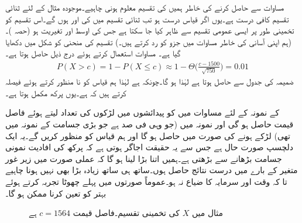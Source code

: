  مساوات  سے  حاصل کرنے کی خاطر ہمیں  کی تقسیم  معلوم ہونی چاہیے۔موجودہ مثال کے لئے ثنائی تقسیم کافی درست ہے۔یوں اگر قیاس درست ہو تب ثنائی تقسیم میں  کی  اور  ہوں گے۔اس تقسیم کو تخمینی طور پر ایسی عمومی تقسیم سے  ظاہر کیا جا سکتا ہے جس کی اوسط  اور تغیریت  ہو (حصہ )۔ (ہم اپنی آسانی کی خاطر مساوات  میں جزو  کو رد کرتے ہیں۔) تقسیم کی منحنی کو شکل  میں دکھایا گیا ہے۔ مساوات  استعمال کرتے ہوئے درج ذیل حاصل ہوتا ہے۔
\begin{align*}
P(X>c)=1-P(X\le c)\approx 1-\Theta\big(\frac{c-1500}{\sqrt{750}}\big)=0.01
\end{align*}
ضمیمہ  کی جدول  سے  حاصل ہوتا ہے  لہٰذا  ہو گا۔چونکہ  ہے لہٰذا ہم قیاس کو نا منظور کرتے ہوئے فیصلہ کرتے ہیں کہ  ہے۔یوں پرکھ مکمل ہوتا ہے۔

 کے نمونہ کے لئے  مساوات  میں  کو  پیدائشوں میں لڑکوں کی تعداد لیتے ہوئے  فاصل قیمت  حاصل ہو گی اور نمونہ میں  (جو وہی فی صد ہے جو  بڑی جسامت کے نمونہ میں تھی)  لڑکے ہونے کی صورت میں  حاصل ہو گا اور ہم قیاس کو منظور کریں گے۔یہ ایک دلچسپ صورت حال ہے جس سے یہ حقیقت اجاگر ہوتی ہے کہ پرکھ کی افادیت نمونی جسامت  بڑھانے سے بڑھتی ہے۔ہمیں  اتنا بڑا لینا ہو گا کہ عملی صورت میں زیر غور متغیر کے بارے میں درست نتائج حاصل ہوں۔ساتھ ہی ساتھ  زیادہ بڑا بھی نہیں ہونا چاہیے تا کہ وقت اور سرمایہ کا ضیاع نہ ہو۔عموماً صورتوں میں پہلے چھوٹا تجربہ کرتے ہوئے بہتر  کو تعین کرنا ممکن ہو گا۔  
\begin{figure}
\centering
{}
\caption{مثال  میں $X$ کی تخمینی تقسیم۔فاصل قیمت $c=1564$ ہے}
\label{شکل_مثال_شماریات_لڑکا_یا_لڑکی}
\end{figure}

